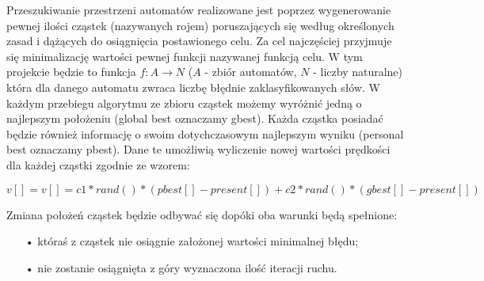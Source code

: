 \documentclass{llncs}
\begin{document}
Przeszukiwanie przestrzeni automatów realizowane jest poprzez wygenerowanie pewnej ilości cząstek (nazywanych rojem) poruszających się według określonych zasad i dążących do osiągnięcia postawionego celu. Za cel najczęściej przyjmuje się minimalizację wartości pewnej funkcji nazywanej funkcją celu. W tym projekcie będzie to funkcja $f:A \rightarrow N$ ($A$ - zbiór automatów, $N$ - liczby naturalne) która dla danego automatu zwraca liczbę błędnie zaklasyfikowanych słów. W każdym przebiegu algorytmu ze zbioru cząstek możemy wyróżnić jedną o najlepszym położeniu (global best oznaczamy gbest). Każda cząstka posiadać będzie również informację o swoim dotychczasowym najlepszym wyniku (personal best oznaczamy pbest). Dane te umożliwią wyliczenie nowej wartości prędkości dla każdej cząstki zgodnie ze wzorem: 

\begin{center}
$v[] = v[] = c1 * rand() * (pbest[] - present[]) + c2 * rand() * (gbest[] - present[])$
\end{center}

Zmiana położeń cząstek będzie odbywać się dopóki oba warunki będą spełnione:

\begin{itemize}
	\item[•] któraś z cząstek nie osiągnie założonej wartości minimalnej błędu;
	\item[•] nie zostanie osiągnięta z góry wyznaczona ilość iteracji ruchu.
\end{itemize}
\end{document}
